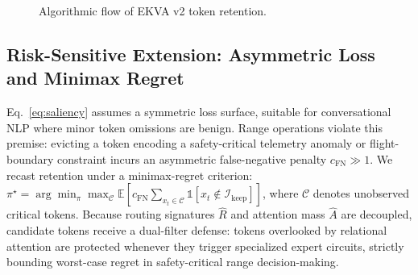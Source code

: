 \documentclass[conference]{IEEEtran}
\begin{document}
\begin{figure}[t]
\begin{center}
\end{center}
\vspace{-2mm}
\caption{Algorithmic flow of EKVA v2 token retention.}
\label{alg:ekva}
\end{figure}

\subsection{Risk-Sensitive Extension: Asymmetric Loss and Minimax Regret}
Eq.~\eqref{eq:saliency} assumes a symmetric loss surface, suitable for conversational NLP where minor token omissions are benign. Range operations violate this premise: evicting a token encoding a safety-critical telemetry anomaly or flight-boundary constraint incurs an asymmetric false-negative penalty $c_{\text{FN}} \gg 1$. We recast retention under a minimax-regret criterion: $\pi^\star = \arg\min_{\pi} \max_{\mathcal{C}} \mathbb{E}[ c_{\text{FN}} \sum_{x_t \in \mathcal{C}} \mathbb{1}[x_t \notin \mathcal{I}_{\text{keep}}] ]$, where $\mathcal{C}$ denotes unobserved critical tokens. Because routing signatures $\hat{R}$ and attention mass $\hat{A}$ are decoupled, candidate tokens receive a dual-filter defense: tokens overlooked by relational attention are protected whenever they trigger specialized expert circuits, strictly bounding worst-case regret in safety-critical range decision-making.
\end{document}
